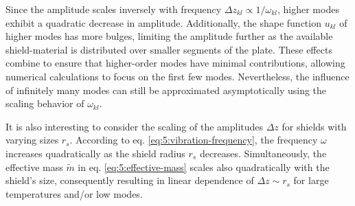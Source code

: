 Since the amplitude scales inversely with frequency $\Delta z_{kl} \propto 1/\omega_{kl}$, higher modes exhibit a quadratic decrease in amplitude.
Additionally, the shape function $u_{kl}$ of higher modes has more bulges, limiting the amplitude further as the available shield-material is distributed over smaller segments of the plate.
These effects combine to ensure that higher-order modes have minimal contributions, allowing numerical calculations to focus on the first few modes.
Nevertheless, the influence of infinitely many modes can still be approximated asymptotically using the scaling behavior of $\omega_{kl}$.

It is also interesting to consider the scaling of the amplitudes $\Delta z$ for shields with varying sizes $r_s$.
According to eq. \eqref{eq:5:vibration-frequency}, the frequency $\omega$ increases quadratically as the shield radius $r_s$ decreases.
Simultaneously, the effective mass $\tilde{m}$ in eq. \eqref{eq:5:effective-mass} scales also quadratically with the shield's size, consequently resulting in linear dependence of $\Delta z \sim r_s$ for large temperatures and/or low modes.